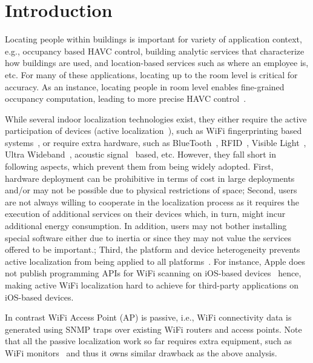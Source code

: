 \section{Introduction}
\label{sec:intro}


Locating people within buildings is important for variety of application context, e.g., occupancy based HAVC control, building analytic services
that characterize how buildings are used, and location-based services such as
where an employee is, etc. For many of these applications, locating up to the room level is critical for accuracy. As an instance, locating people in room level enables fine-grained occupancy computation, leading to more precise HAVC control~\cite{afram2014theory}.

 While several indoor localization technologies exist, they either require the active participation of devices (active localization~\cite{deak2012survey}), such as WiFi fingerprinting based systems~\cite{kotaru2015spotfi}, or require extra hardware, such as BlueTooth~\cite{diaz2010bluepass}, RFID~\cite{shirehjini2012rfid}, Visible Light~\cite{kuo2014luxapose}, Ultra Wideband~\cite{gezici2005localization}, acoustic signal~\cite{huang2015swadloon} based, etc. However, they fall short in following aspects, which prevent them from being widely adopted. First, hardware deployment can be prohibitive in terms of cost in large deployments and/or may not be possible due to physical restrictions of space; Second, users are not always willing to cooperate in the localization process as it requires the execution of additional services on their devices which, in turn, might incur additional energy consumption. In addition, users may not bother installing special software either due to inertia or since they may not value the services offered to be important.; Third, the platform and device heterogeneity prevents active localization from being applied to all platforms~\cite{apple}. For instance, Apple does not publish programming APIs for WiFi scanning on iOS-based devices~\cite{zeinalipour2017anatomy} hence, making active WiFi localization hard to achieve for third-party applications on iOS-based devices. 

In contrast WiFi Access Point (AP) is passive, i.e., WiFi connectivity data is generated using SNMP traps over existing WiFi routers and access points. Note that all the passive localization work so far requires extra equipment, such as WiFi monitors~\cite{youssef2007challenges,xu2013scpl,seifeldin2013nuzzer,musa2012tracking} and thus it owns similar drawback as the above analysis. 

